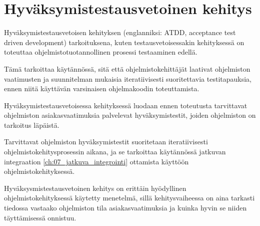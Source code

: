 \section{Hyväksymistestausvetoinen kehitys} \label{ch:08_hyvaksymistestausvetoinen_kehitys}

  Hyväksymistestausvetoisen kehityksen (englanniksi: ATDD, acceptance test driven development) tarkoituksena, kuten testausvetoisessakin kehityksessä on toteuttaa ohjelmistotuotannollinen prosessi testaaminen edellä.

  Tämä tarkoittaa käytännössä, sitä että ohjelmistokehittäjät laativat ohjelmiston vaatimusten ja suunnitelman mukaisia iteratiivisesti suoritettavia testitapauksia, ennen niitä käyttävän varsinaisen ohjelmakoodin toteuttamista.

  Hyväksymistestausvetoisessa kehityksessä luodaan ennen toteutusta tarvittavat ohjelmiston asiakasvaatimuksia palvelevat hyväksymistestit, joiden ohjelmiston on tarkoitus läpäistä.

  Tarvittavat ohjelmiston hyväksymistestit suoritetaan iteratiivisesti ohjelmistokehitysprosessin aikana, ja se tarkoittaa käytännössä jatkuvan integraation \ref{ch:07_jatkuva_integrointi} ottamista käyttöön ohjelmistokehityksessä.

  Hyväksysmistestausvetoinen kehitys on erittäin hyödyllinen ohjelmistokehityksessä käytetty menetelmä, sillä kehitysvaiheessa on aina tarkasti tiedossa vastaako ohjelmiston tila asiakasvaatimuksia ja kuinka hyvin se niiden täyttämisessä onnistuu.


